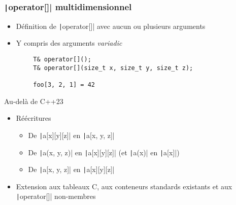 \documentclass[C++.tex]{subfiles}
\begin{document}
\begin{frame}[fragile]
	\frametitle{\texttt|operator[]| multidimensionnel}
	\begin{itemize}
		\item Définition de \texttt|operator[]| avec aucun ou plusieurs arguments
		\item Y compris des arguments \textit{variadic}
	\end{itemize}

	\begin{verbatim}
		T& operator[]();
		T& operator[](size_t x, size_t y, size_t z);

		foo[3, 2, 1] = 42
	\end{verbatim}

	\begin{block}{Au-delà de C++23}
		\begin{itemize}
			\item Réécritures
			\begin{itemize}
				\item De \texttt|a[x][y][z]| en \texttt|a[x, y, z]|
				\item De \texttt|a(x, y, z)| en \texttt|a[x][y][z]| (et  \texttt|a(x)| en \texttt|a[x]|)
				\item De \texttt|a[x, y, z]| en \texttt|a[x][y][z]|
			\end{itemize}
			\item Extension aux tableaux C, aux conteneurs standards existants et aux \texttt|operator[]| non-membres
		\end{itemize}
	\end{block}



\end{frame}
\end{document}
